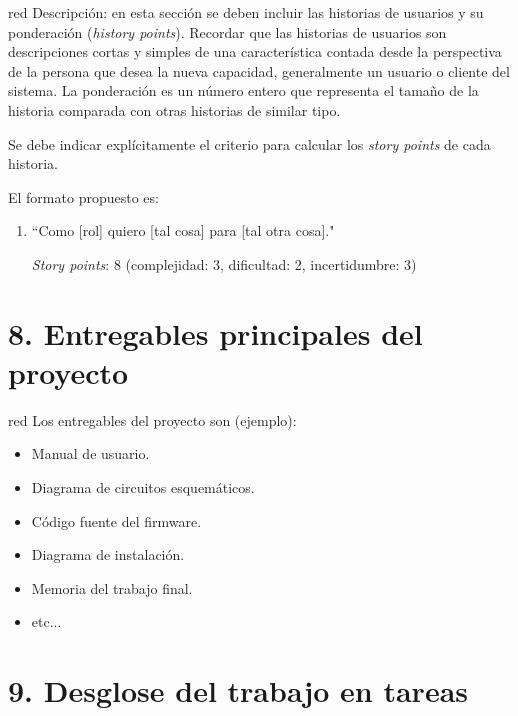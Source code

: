 \documentclass[
11pt, %
codirector, %
]{charter}
\begin{document}
\begin{consigna}{red}
	Descripción: en esta sección se deben incluir las historias de usuarios y su ponderación (\textit{history points}). Recordar que las historias de usuarios son descripciones cortas y simples de una característica contada desde la perspectiva de la persona que desea la nueva capacidad, generalmente un usuario o cliente del sistema. La ponderación es un número entero que representa el tamaño de la historia comparada con otras historias de similar tipo.

	Se debe indicar explícitamente el criterio para calcular los \textit{story points} de cada historia.

	El formato propuesto es:
	\begin{enumerate}
		\item ``Como [rol] quiero [tal cosa] para [tal otra cosa]."

		      \textit{Story points}: 8 (complejidad: 3, dificultad: 2, incertidumbre: 3)
	\end{enumerate}
\end{consigna}

\section{8. Entregables principales del proyecto}
\label{sec:entregables}

\begin{consigna}{red}
	Los entregables del proyecto son (ejemplo):

	\begin{itemize}
		\item Manual de usuario.
		\item Diagrama de circuitos esquemáticos.
		\item Código fuente del firmware.
		\item Diagrama de instalación.
		\item Memoria del trabajo final.
		\item etc...
	\end{itemize}
\end{consigna}

\section{9. Desglose del trabajo en tareas}
\label{sec:wbs}
\end{document}
